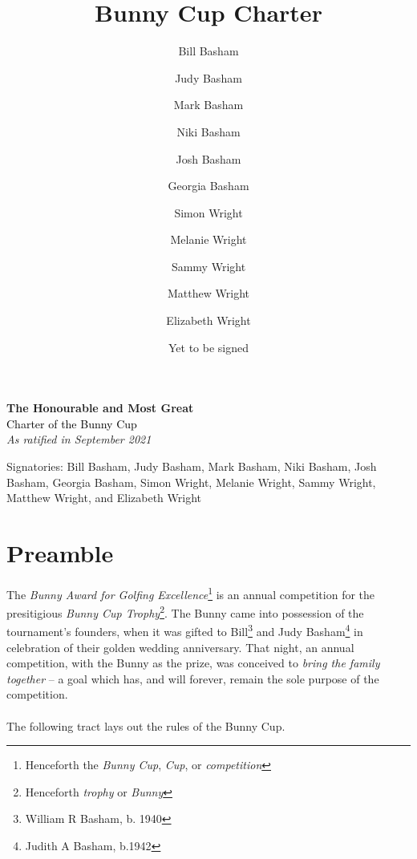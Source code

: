\documentclass[a4paper]{article}
\title{Bunny Cup Charter}
\author{Bill Basham \and Judy Basham \and Mark Basham \and Niki Basham \and Josh Basham \and Georgia Basham \and Simon Wright \and Melanie Wright \and  Sammy Wright \and Matthew Wright \and Elizabeth Wright}
\date{Yet to be signed}
\begin{document}
\begin{titlepage} %

	\raggedleft %
	
	\vspace*{\baselineskip} %
	
	

	
	
	
	\textbf{\LARGE The Honourable and Most Great}\\[\baselineskip] %
	
	{\textcolor{Black}{\Huge Charter of the Bunny Cup}}\\[\baselineskip] %
	
	{\Large \textit{As ratified in September 2021}} %
	
	\vfill %
	
		{\Large Signatories: Bill Basham, Judy Basham,  Mark Basham,  Niki Basham,  Josh Basham, Georgia Basham, Simon Wright,  Melanie Wright,  Sammy Wright, Matthew Wright, and Elizabeth Wright} %
	
	\vspace*{3\baselineskip} %

\end{titlepage}

\section*{Preamble}

The \emph{Bunny Award for Golfing Excellence}\footnote{Henceforth the \emph{Bunny Cup}, \emph{Cup}, or \emph{competition}} is an annual competition for the presitigious \emph{Bunny Cup Trophy}\footnote{Henceforth \emph{trophy} or \emph{Bunny}}. The Bunny came into possession of the tournament's founders, when it was gifted to Bill\footnote{William R Basham, b. 1940} and Judy Basham\footnote{Judith A Basham, b.1942} in celebration of their golden wedding anniversary. That night, an annual competition, with the Bunny as the prize, was conceived to \emph{bring the family together} – a goal which has, and will forever, remain the sole purpose of the competition.
\\
\\
\indent The following tract lays out the rules of the Bunny Cup.
\end{document}
